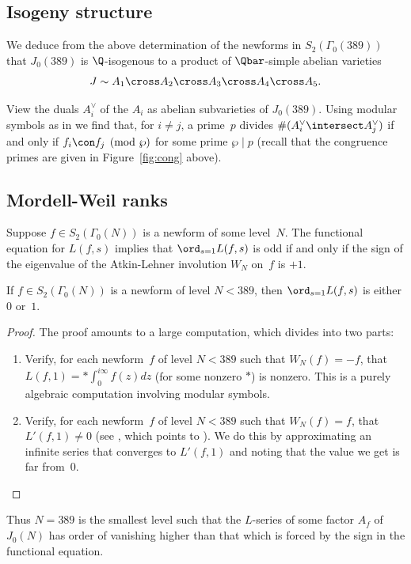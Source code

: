 \documentclass{report}
\begin{document}
\subsection{Isogeny structure}
We deduce from the above determination of the newforms in $S_2(\Gamma_0(389))$
that $J_0(389)$ is $\Q$-isogenous to a product of $\Qbar$-simple abelian varieties
$$
  J \sim A_1\cross A_2 \cross A_3 \cross A_4 \cross A_{5}.
$$

View the duals $A_i^{\vee}$ of the $A_i$ as abelian subvarieties of $J_0(389)$.
Using modular symbols as in \cite[\S3.4]{agashe-stein:bsd}
we find that, for $i\neq j$, a prime~$p$
divides $\#(A_i^{\vee}\intersect A_j^{\vee})$ if and only if $f_i\con f_j\pmod{\wp}$
for some prime $\wp\mid p$ (recall that the congruence primes
are given in Figure~\ref{fig:cong} above).


\subsection{Mordell-Weil ranks}\label{sec:mwranks}
Suppose $f\in S_2(\Gamma_0(N))$ is a newform of some level~$N$.
The functional equation for $L(f,s)$ implies that $\ord_{s=1}L(f,s)$
is odd if and only if the sign of the eigenvalue of the Atkin-Lehner
involution $W_N$ on~$f$ is $+1$.
\begin{proposition}\label{prop:minanrank}
If $f\in S_2(\Gamma_0(N))$ is a newform of level $N<389$, then
$\ord_{s=1}L(f,s)$ is either$0$ or~$1$.
\end{proposition}
\begin{proof}
The proof amounts to a large computation, which divides into two parts:
\begin{enumerate}
\item Verify, for each newform~$f$ of level $N<389$ such that
$W_N(f) = -f$, that $L(f,1) = *\int_{0}^{i\infty} f(z) dz$ (for some nonzero $*$)
is nonzero.  This is a purely algebraic computation involving modular symbols.
\item Verify, for each newform~$f$ of level $N<389$ such that
$W_N(f) = f$, that $L'(f,1)\neq 0$ (see \cite[\S4.1]{empirical},
which points to \cite[\S2.11,\S2.13]{cremona:algs}).
We do this by approximating an infinite
series that converges to $L'(f,1)$ and noting that the value we
get is far from~$0$.
\end{enumerate}
\end{proof}

Thus $N=389$ is the smallest level such that the $L$-series of
some factor $A_f$ of $J_0(N)$ has order of vanishing higher than
that which is forced by the sign in the functional equation.
\end{document}
